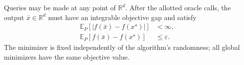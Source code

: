 \documentclass[10pt]{article}
\theoremstyle{definition}
\begin{document}
Queries may be made at any point of $\mathbb{R}^d$. After the allotted oracle calls, the output $\bar{x}\in\mathbb{R}^d$ must have an integrable objective gap and satisfy
\[
\begin{aligned}
\mathbb{E}_{P}\!\left[\left|f(\bar{x})-f(x^\star)\right|\right]&<\infty,\\
\mathbb{E}_{P}[f(\bar{x})-f(x^\star)]&\leq\varepsilon.
\end{aligned}
\]
The minimizer is fixed independently of the algorithm's randomness; all global minimizers have the same objective value.
\end{document}
